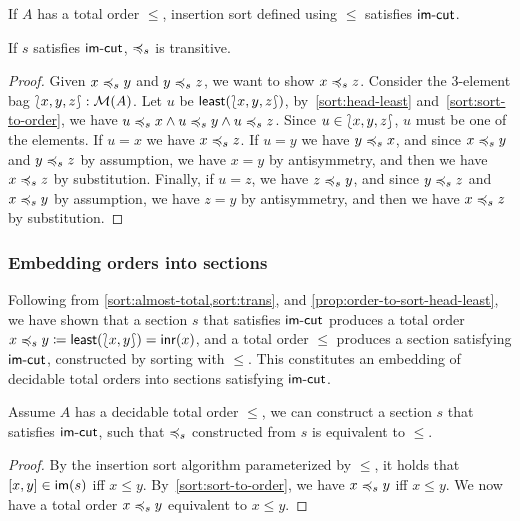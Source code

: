 \begin{proposition}
    \label{prop:order-to-sort-head-least}
    If $A$ has a total order $\leq$,
    insertion sort defined using $\leq$ satisfies $\operatorname{\mathsf{im-cut}}$.
\end{proposition}

\begin{proposition}
    \label{sort:trans}
    If $s$ satisfies $\operatorname{\mathsf{im-cut}}$, $\preccurlyeq_{s}$ is transitive.
\end{proposition}
\begin{proof}
    Given $x \preccurlyeq_{s} y$ and $y \preccurlyeq_{s} z$, we want to show $x \preccurlyeq_{s} z$.
    Consider the 3-element bag ${\lbag}{x,y,z}{\rbag} : \mathcal{M}(A)$.
    Let $u$ be $\operatorname{\mathsf{least}}({\lbag}{x,y,z}{\rbag})$,
    by~\cref{sort:head-least} and~\cref{sort:sort-to-order},
    we have $u \preccurlyeq_{s} x \land u \preccurlyeq_{s} y \land u \preccurlyeq_{s} z$.
    Since $u \in {\lbag}{x,y,z}{\rbag}$, $u$ must be one of the elements.
    If $u = x$ we have $x \preccurlyeq_{s} z$.
    If $u = y$ we have $y \preccurlyeq_{s} x$,
    and since $x \preccurlyeq_{s} y$ and $y \preccurlyeq_{s} z$ by assumption,
    we have $x = y$ by antisymmetry, and then we have $x \preccurlyeq_{s} z$ by substitution.
    Finally, if $u = z$, we have $z \preccurlyeq_{s} y$, and since $y \preccurlyeq_{s} z$ and $x \preccurlyeq_{s} y$ by assumption,
    we have $z = y$ by antisymmetry, and then we have $x \preccurlyeq_{s} z$ by substitution.
\end{proof}

\subsubsection{Embedding orders into sections}

Following from \cref{sort:almost-total,sort:trans},
and \cref{prop:order-to-sort-head-least},
we have shown that a section $s$ that satisfies $\operatorname{\mathsf{im-cut}}$ produces a total order
$x \leqs y \defeq \term{least}(\bag{x, y}) \id \inr(x)$,
and a total order $\leq$ produces a section satisfying $\operatorname{\mathsf{im-cut}}$,
constructed by sorting with $\leq$.
%
This constitutes an embedding of decidable total orders into sections satisfying $\operatorname{\mathsf{im-cut}}$.

\begin{proposition}\label{sort:o2s2o}
    Assume $A$ has a decidable total order $\leq$, we can construct a section $s$ that
    satisfies $\operatorname{\mathsf{im-cut}}$, such that $\preccurlyeq_{s}$ constructed from $s$ is equivalent
    to $\leq$.
\end{proposition}
\begin{proof}
    By the insertion sort algorithm parameterized by $\leq$,
    it holds that $\inimage{[x, y]}$ iff $x \leq y$.
    By~\cref{sort:sort-to-order}, we have $x \preccurlyeq_{s} y$ iff $x \leq y$.
    We now have a total order $x \preccurlyeq_{s} y$ equivalent to $x \leq y$.
\end{proof}

